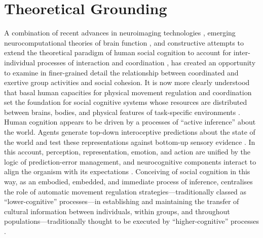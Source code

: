 \section{Theoretical Grounding}
A combination of recent advances in neuroimaging technologies \citep{Frith2007}, emerging neurocomputational theories of brain function \citep{Friston2010,Frith2010,Clark2013}, and constructive attempts to extend the theoretical paradigm of human social cognition to account for inter-individual processes of interaction and coordination \citep{Sebanz2006,Dale2014}, has created an opportunity to examine in finer-grained detail the relationship between coordinated and exertive group activities and social cohesion.  It is now more clearly understood that basal human capacities for physical movement regulation and coordination set the foundation for social cognitive systems whose resources are distributed between brains, bodies, and physical features of task-specific environments \citep{Hutchins2000,Kirsh2006,Semin2008,Semin2012,Coey2012}.
Human cognition appears to be driven by a processes of ``active inference'' \citep{Friston2010} about the world.  Agents generate top-down interoceptive predictions about the state of the world and test these representations against bottom-up sensory evidence \citep{Clark2013}.  In this account, perception, representation, emotion, and action are unified by the logic of prediction-error management, and neurocognitive components interact to align the organism with its expectations \citep{Pezzulo2014}.  Conceiving of social cognition in this way, as an embodied, embedded, and immediate process of inference, centralises the role of automatic movement regulation strategies---traditionally classed as ``lower-cognitive'' processes---in establishing and maintaining the transfer of cultural information between individuals, within groups, and throughout populations---traditionally thought to be executed by  ``higher-cognitive'' processes \citep{Claidiere2014}.


